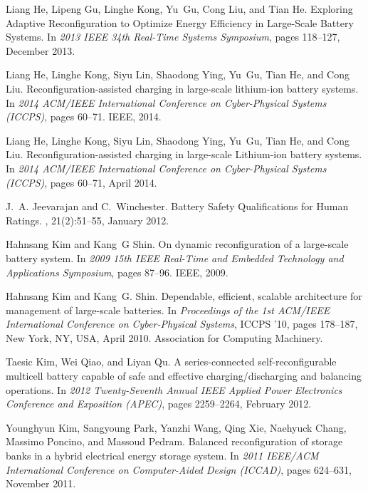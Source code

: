 \documentclass{article}
\begin{document}
\begin{thebibliography}{10}
Liang He, Lipeng Gu, Linghe Kong, Yu~Gu, Cong Liu, and Tian He.
\newblock Exploring {{Adaptive Reconfiguration}} to {{Optimize Energy
  Efficiency}} in {{Large-Scale Battery Systems}}.
\newblock In {\em 2013 {{IEEE}} 34th {{Real-Time Systems Symposium}}}, pages
  118--127, December 2013.

Liang He, Linghe Kong, Siyu Lin, Shaodong Ying, Yu~Gu, Tian He, and Cong Liu.
\newblock Reconfiguration-assisted charging in large-scale lithium-ion battery
  systems.
\newblock In {\em 2014 ACM/IEEE International Conference on Cyber-Physical
  Systems (ICCPS)}, pages 60--71. IEEE, 2014.

Liang He, Linghe Kong, Siyu Lin, Shaodong Ying, Yu~Gu, Tian He, and Cong Liu.
\newblock Reconfiguration-assisted charging in large-scale {{Lithium-ion}}
  battery systems.
\newblock In {\em 2014 {{ACM}}/{{IEEE International Conference}} on
  {{Cyber-Physical Systems}} ({{ICCPS}})}, pages 60--71, April 2014.

J.~A. Jeevarajan and C.~Winchester.
\newblock Battery {{Safety Qualifications}} for {{Human Ratings}}.
, 21(2):51--55, January 2012.

Hahnsang Kim and Kang~G Shin.
\newblock On dynamic reconfiguration of a large-scale battery system.
\newblock In {\em 2009 15th IEEE Real-Time and Embedded Technology and
  Applications Symposium}, pages 87--96. IEEE, 2009.

Hahnsang Kim and Kang~G. Shin.
\newblock Dependable, efficient, scalable architecture for management of
  large-scale batteries.
\newblock In {\em Proceedings of the 1st {{ACM}}/{{IEEE International
  Conference}} on {{Cyber-Physical Systems}}}, {{ICCPS}} '10, pages 178--187,
  {New York, NY, USA}, April 2010. {Association for Computing Machinery}.

Taesic Kim, Wei Qiao, and Liyan Qu.
\newblock A series-connected self-reconfigurable multicell battery capable of
  safe and effective charging/discharging and balancing operations.
\newblock In {\em 2012 {{Twenty-Seventh Annual IEEE Applied Power Electronics
  Conference}} and {{Exposition}} ({{APEC}})}, pages 2259--2264, February 2012.

Younghyun Kim, Sangyoung Park, Yanzhi Wang, Qing Xie, Naehyuck Chang, Massimo
  Poncino, and Massoud Pedram.
\newblock Balanced reconfiguration of storage banks in a hybrid electrical
  energy storage system.
\newblock In {\em 2011 {{IEEE}}/{{ACM International Conference}} on
  {{Computer-Aided Design}} ({{ICCAD}})}, pages 624--631, November 2011.


\end{thebibliography}
\end{document}
